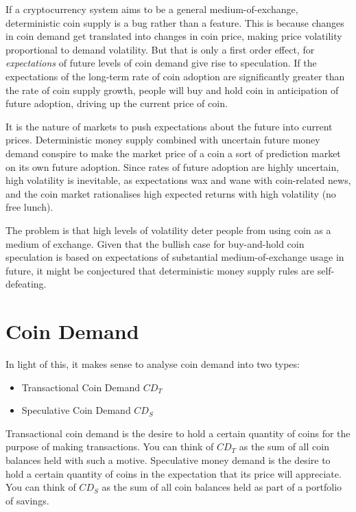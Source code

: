 \documentclass[twocolumn]{article}
\begin{document}
If a cryptocurrency system aims to be a general medium-of-exchange,
deterministic coin supply is a bug rather than a feature. This is
because changes in coin demand get translated into changes in coin
price, making price volatility proportional to demand volatility. But
that is only a first order effect, for \emph{expectations} of future
levels of coin demand give rise to speculation. If the expectations of
the long-term rate of coin adoption are significantly greater than the
rate of coin supply growth, people will buy and hold coin in
anticipation of future adoption, driving up the current price of coin.

It is the nature of markets to push expectations about the future into
current prices. Deterministic money supply combined with uncertain
future money demand conspire to make the market price of a coin a sort
of prediction market on its own future adoption. Since rates of future
adoption are highly uncertain, high volatility is inevitable, as
expectations wax and wane with coin-related news, and the coin market
rationalises high expected returns with high volatility (no free
lunch).

The problem is that high levels of volatility deter people from using
coin as a medium of exchange. Given that the bullish case for
buy-and-hold coin speculation is based on expectations of substantial
medium-of-exchange usage in future, it might be conjectured that
deterministic money supply rules are self-defeating.

\section*{Coin Demand}
In light of this, it makes sense to analyse coin demand into two
types:
\begin{itemize}
\item Transactional Coin Demand $CD_{T}$
\item Speculative Coin Demand $CD_{S}$
\end{itemize}
Transactional coin demand is the desire to hold a certain quantity of
coins for the purpose of making transactions. You can think of
$CD_{T}$ as the sum of all coin balances held with such a
motive. Speculative money demand is the desire to hold a certain
quantity of coins in the expectation that its price will
appreciate. You can think of $CD_{S}$ as the sum of all coin balances
held as part of a portfolio of savings. 
\end{document}
